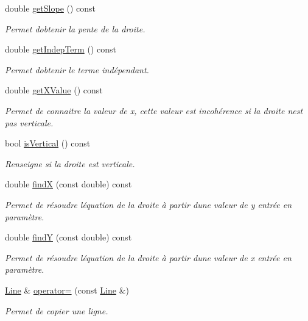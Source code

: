 \begin{DoxyCompactItemize}
double \hyperlink{classLine_a9eab2739a90a731de04b385f483f68b3}{get\+Slope} () const 
\begin{DoxyCompactList}\small\item\em Permet d\textquotesingle{}obtenir la pente de la droite. \end{DoxyCompactList}\item 
double \hyperlink{classLine_a7a543f2f53ad54555a56c845375f2a7d}{get\+Indep\+Term} () const 
\begin{DoxyCompactList}\small\item\em Permet d\textquotesingle{}obtenir le terme indépendant. \end{DoxyCompactList}\item 
double \hyperlink{classLine_aa50bf9b9bc8fa001e6f33a3914e749af}{get\+X\+Value} () const 
\begin{DoxyCompactList}\small\item\em Permet de connaitre la valeur de x, cette valeur est incohérence si la droite n\textquotesingle{}est pas verticale. \end{DoxyCompactList}\item 
bool \hyperlink{classLine_adb1e4c411e63f9ac31f70648fa3149d7}{is\+Vertical} () const 
\begin{DoxyCompactList}\small\item\em Renseigne si la droite est verticale. \end{DoxyCompactList}\item 
double \hyperlink{classLine_a013de9d97b5c80dd2e52888022e58a5d}{find\+X} (const double) const 
\begin{DoxyCompactList}\small\item\em Permet de résoudre l\textquotesingle{}équation de la droite à partir d\textquotesingle{}une valeur de y entrée en paramètre. \end{DoxyCompactList}\item 
double \hyperlink{classLine_a6573ef5cdd6324971770d4a556fed4ae}{find\+Y} (const double) const 
\begin{DoxyCompactList}\small\item\em Permet de résoudre l\textquotesingle{}équation de la droite à partir d\textquotesingle{}une valeur de x entrée en paramètre. \end{DoxyCompactList}\item 
\hyperlink{classLine}{Line} \& \hyperlink{classLine_aff9faa550dc184fac56e3ef22439fdf9}{operator=} (const \hyperlink{classLine}{Line} \&)
\begin{DoxyCompactList}\small\item\em Permet de copier une ligne. \end{DoxyCompactList}\item 

\end{DoxyCompactItemize}
